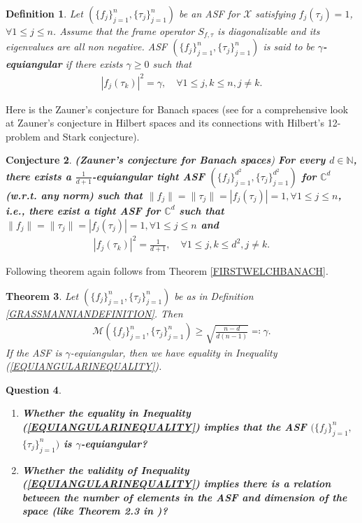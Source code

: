 \documentclass{amsart}
\newtheorem{theorem}{Theorem}[section]
\newtheorem{conjecture}[theorem]{Conjecture}
\newtheorem{definition}[theorem]{Definition}
\newtheorem{question}[theorem]{Question}
\begin{document}
  \begin{definition}
	Let  $ (\{f_j \}_{j=1}^n, \{\tau_j \}_{j=1}^n) $ be an ASF  for $\mathcal{X}$ satisfying $f_j(\tau_j)=1$, $\forall 1\leq j \leq n$. 	Assume that  the  frame operator 
$	S_{f, \tau}$  is diagonalizable and its eigenvalues are all non negative.   ASF $ (\{f_j \}_{j=1}^n, \{\tau_j \}_{j=1}^n) $   is said to be 	\textbf{$\gamma$-equiangular} if there exists $\gamma\geq0$ such that
  	\begin{align*}
  		|f_j(\tau_k)|^2=\gamma, \quad \forall  1\leq j,k \leq n, j\neq k.
  	\end{align*}
  \end{definition}
 Here is the  Zauner's conjecture for Banach spaces (see \cite{APPLEBY123, APPLEBY, ZAUNER, SCOTTGRASSL, FUCHSHOANGSTACEY, RENESBLUMEKOHOUTSCOTTCAVES, APPLEBYSYMM, BENGTSSON, APPLEBYFLAMMIAMCCONNELLYARD, KOPPCON, GOURKALEV, BENGTSSONZYCZKOWSKI, PAWELRUDNICKIZYCZKOWSKI, BENGTSSON123, MAGSINO}  for a comprehensive look at Zauner's conjecture in Hilbert spaces and its connections with Hilbert's 12-problem and Stark conjecture).
  \begin{conjecture}
  	\textbf{(Zauner's conjecture for Banach spaces}) \textbf{For  every $d\in \mathbb{N}$, there exists a $\frac{1}{d+1}$-equiangular tight ASF  $ (\{f_j \}_{j=1}^{d^2}, \{\tau_j \}_{j=1}^{d^2}) $   for $\mathbb{C}^d$ (w.r.t. any norm) such that $\|f_j\|=\|\tau_j\|=|f_j(\tau_j)|=1, \forall1 \leq j \leq n$, i.e., there exist a tight ASF for  $\mathbb{C}^d$ such that $\|f_j\|=\|\tau_j\|=|f_j(\tau_j)|=1, \forall1 \leq j \leq n$ and 
  	\begin{align*}
  		|f_j(\tau_k)|^2=\frac{1}{d+1}, \quad \forall  1\leq j,k \leq d^2, j\neq k.	
  \end{align*}}
  \end{conjecture}
  
  Following theorem again follows from Theorem \ref{FIRSTWELCHBANACH}.
  \begin{theorem}\label{CNG2}
	Let  $ (\{f_j \}_{j=1}^n, \{\tau_j \}_{j=1}^n) $ be as in Definition \ref{GRASSMANNIANDEFINITION}.   Then 
  	\begin{align}\label{EQUIANGULARINEQUALITY}
  		\mathcal{M}(\{f_j \}_{j=1}^n, \{\tau_j \}_{j=1}^n )\geq \sqrt{\frac{n-d}{d(n-1)}} \eqqcolon\gamma.
  	\end{align}
  	If the ASF is $\gamma$-equiangular, then we have equality in Inequality (\ref{EQUIANGULARINEQUALITY}).
  \end{theorem}
\begin{question}
\begin{enumerate}[\upshape (i)]
	\item \textbf{	Whether the equality in Inequality (\ref{EQUIANGULARINEQUALITY}) implies that the ASF $ (\{f_j \}_{j=1}^n,$ $ \{\tau_j \}_{j=1}^n) $  is $\gamma$-equiangular?}
	\item \textbf{Whether the validity of Inequality (\ref{EQUIANGULARINEQUALITY}) implies there is a relation between the number of elements in the ASF and dimension of the space (like Theorem 2.3 in \cite{STROHMERHEATH})?}
\end{enumerate}
\end{question}
  
\end{document}
